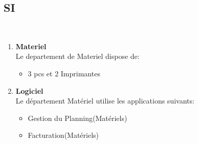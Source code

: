\documentclass [a4paper] {report}
\begin{document}
\subsection{SI}\\
\begin{enumerate}

\item  \textbf{Materiel}\\

Le departement de Materiel dispose de:\\

\begin{itemize}
\item 3 pcs et 2 Imprimantes\\
\end{itemize}

\item  \textbf{ Logiciel}\\

Le département Matériel utilise les applications suivants:\\

\begin{itemize}
\item  Gestion du Planning(Matériels)\\
\item  Facturation(Matériels)
\end{itemize}
\end{enumerate}
\end{document}

